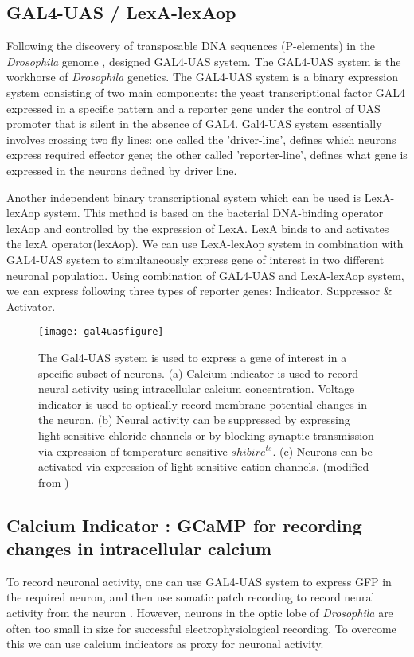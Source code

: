 \subsection{GAL4-UAS / LexA-lexAop}
Following the discovery of transposable DNA sequences (P-elements) in the \textit{Drosophila} genome \parencite{Rubin1982}, \cite{Brand1993} designed GAL4-UAS system. The GAL4-UAS system is the workhorse of \textit{Drosophila} genetics. The GAL4-UAS system is a binary expression system consisting of two main components: the yeast transcriptional factor GAL4 expressed in a specific pattern and a reporter gene under the control of UAS promoter that is silent in the absence of GAL4. Gal4-UAS system essentially involves crossing two fly lines: one called the 'driver-line', defines which neurons express required effector gene; the other called 'reporter-line', defines what gene is expressed in the neurons defined by driver line. 

Another independent binary transcriptional system which can be used is LexA-lexAop system. This method is based on the bacterial DNA-binding operator lexAop and controlled by the expression of LexA. LexA binds to and activates the lexA operator(lexAop). We can use LexA-lexAop system in combination with GAL4-UAS system to simultaneously express gene of interest in two different neuronal population. Using combination of GAL4-UAS and LexA-lexAop system, we can express following three types of reporter genes: Indicator, Suppressor \& Activator.
\begin{figure}[h]
\centering
\hspace*{-1cm} 
\texttt{[image: gal4uasfigure]}
\caption[Genetic tools for functional manipulations in \textit{Drosophila}.] {The Gal4-UAS system is used to express a gene of interest in a specific subset of neurons. (a) Calcium indicator is used to record neural activity using intracellular calcium concentration. Voltage indicator is used to optically record membrane potential changes in the neuron. (b) Neural activity can be suppressed by expressing light sensitive chloride channels or by blocking synaptic transmission via expression of temperature-sensitive $shibire^{ts}$. (c) Neurons can be activated via expression of light-sensitive cation channels. (modified from \cite{Borst2009})}
\label{fig:gal4uas}
\end{figure}
\subsection{Calcium Indicator : GCaMP for recording changes in intracellular calcium}
To record neuronal activity, one can use GAL4-UAS system to express GFP in the required neuron, and then use somatic patch recording to record neural activity from the neuron \parencite{Wilson2004, Joesch2008}. However, neurons in the optic lobe of \textit{Drosophila} are often too small in size for successful electrophysiological recording. To overcome this we can use calcium indicators as proxy for neuronal activity. 

